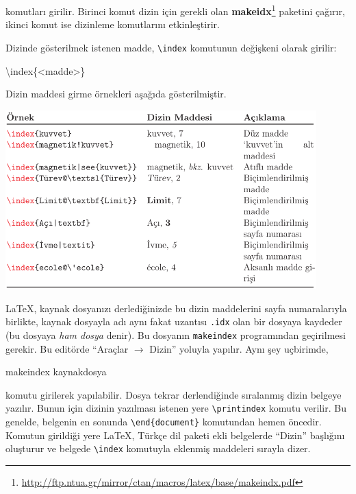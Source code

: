 \documentclass[
  10pt,
]{scrbook}
\newenvironment{Shaded}{}{}
\newcommand{\ExtensionTok}[1]{#1}
\newcommand{\FunctionTok}[1]{\textcolor[rgb]{0.02,0.16,0.49}{#1}}
\newcommand{\NormalTok}[1]{#1}
\renewcommand{\href}[2]{#2\footnote{\url{#1}}}
\theoremstyle{definition}
\theoremstyle{definition}
\theoremstyle{definition}
\theoremstyle{definition}
\theoremstyle{remark}
\begin{document}
komutları girilir. Birinci komut dizin için gerekli olan \href{http://ftp.ntua.gr/mirror/ctan/macros/latex/base/makeindx.pdf}{\textbf{makeidx}} paketini çağırır, ikinci komut ise dizinleme komutlarını etkinleştirir.

Dizinde gösterilmek istenen madde, \texttt{\textbackslash{}index} komutunun değişkeni olarak girilir:

\begin{Shaded}
\begin{Highlighting}[]
\FunctionTok{\textbackslash{}index}\NormalTok{\{\textless{}madde\textgreater{}\}}
\end{Highlighting}
\end{Shaded}

Dizin maddesi girme örnekleri aşağıda gösterilmiştir.

\includegraphics[width=0.9\textwidth,height=\textheight]{images/dizina.png}

LaTeX, kaynak dosyanızı derlediğinizde bu dizin maddelerini sayfa numaralarıyla birlikte, kaynak dosyayla adı aynı fakat uzantısı \texttt{.idx} olan bir dosyaya kaydeder (bu dosyaya \emph{ham dosya} denir). Bu dosyanın \texttt{makeindex} programından geçirilmesi gerekir. Bu editörde ``Araçlar \(\rightarrow\) Dizin'' yoluyla yapılır. Aynı şey uçbirimde,

\begin{Shaded}
\begin{Highlighting}[]
\ExtensionTok{makeindex}\NormalTok{ kaynakdosya}
\end{Highlighting}
\end{Shaded}

komutu girilerek yapılabilir. Dosya tekrar derlendiğinde sıralanmış dizin belgeye yazılır. Bunun için dizinin yazılması istenen yere \texttt{\textbackslash{}printindex} komutu verilir. Bu genelde, belgenin en sonunda \texttt{\textbackslash{}end\{document\}} komutundan hemen öncedir. Komutun girildiği yere LaTeX, Türkçe dil paketi ekli belgelerde ``Dizin'' başlığını oluşturur ve belgede \texttt{\textbackslash{}index} komutuyla eklenmiş maddeleri sırayla dizer.
\end{document}
